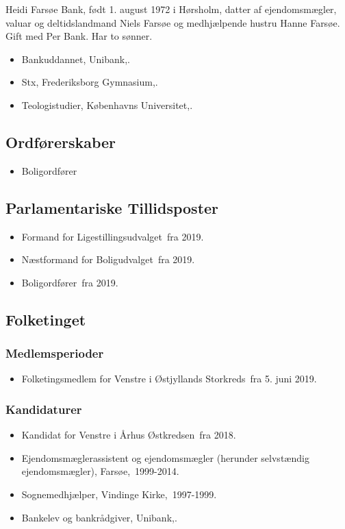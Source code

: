 \documentclass[11pt, a4paper]{awesome-cv}
\begin{document}
\makecvheader[R]
\makelettertitle
\begin{cvletter}
Heidi Farsøe Bank, født 1. august 1972 i Hørsholm, datter af ejendomsmægler, valuar og deltidslandmand Niels Farsøe og medhjælpende hustru Hanne Farsøe. Gift med Per Bank. Har to sønner. 

\begin{itemize}
\item Bankuddannet, Unibank,.
\item Stx, Frederiksborg Gymnasium,.
\item Teologistudier, Københavns Universitet,.
\end{itemize}
\subsection*{Ordførerskaber}
\begin{itemize}
\item Boligordfører
\end{itemize}
\subsection*{Parlamentariske Tillidsposter}
\begin{itemize}
\item Formand for Ligestillingsudvalget fra 2019.
\item Næstformand for Boligudvalget fra 2019.
\item Boligordfører fra 2019.
\end{itemize}
\subsection*{Folketinget}
\subsubsection*{Medlemsperioder}
\begin{itemize}
\item Folketingsmedlem for Venstre i Østjyllands Storkreds fra 5. juni 2019.
\end{itemize}
\subsubsection*{Kandidaturer}
\begin{itemize}
\item Kandidat for Venstre i Århus Østkredsen fra 2018.
\end{itemize}
\begin{itemize}
\item Ejendomsmæglerassistent og ejendomsmægler (herunder selvstændig ejendomsmægler), Farsøe, 1999-2014.
\item Sognemedhjælper, Vindinge Kirke, 1997-1999.
\item Bankelev og bankrådgiver, Unibank,.
\end{itemize}
\end{cvletter}
\end{document}
